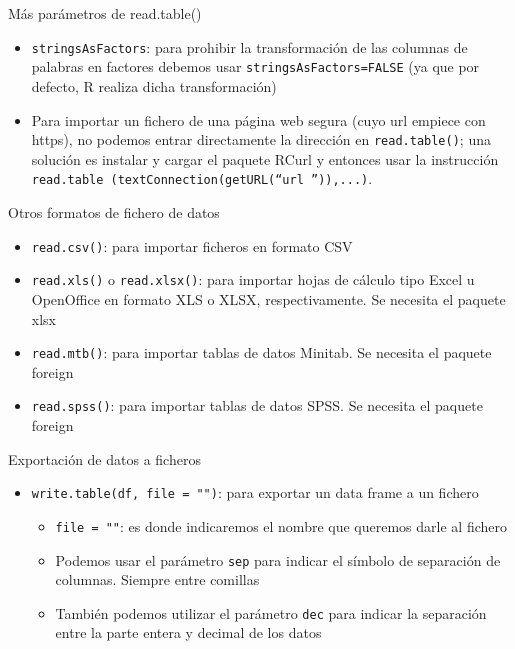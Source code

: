 \documentclass[
  ignorenonframetext,
  aspectratio=169]{beamer}
\providecommand{\tightlist}{%
  \setlength{\itemsep}{0pt}\setlength{\parskip}{0pt}}
\begin{document}
\begin{frame}[fragile]{Más parámetros de read.table()}
\protect\hypertarget{muxe1s-paruxe1metros-de-read.table}{}
\begin{itemize}
\item
  \texttt{stringsAsFactors}: para prohibir la transformación de las
  columnas de palabras en factores debemos usar
  \texttt{stringsAsFactors=FALSE} (ya que por defecto, R realiza dicha
  transformación)
\item
  Para importar un fichero de una página web segura (cuyo url empiece
  con https), no podemos entrar directamente la dirección en
  \texttt{read.table()}; una solución es instalar y cargar el paquete
  RCurl y entonces usar la instrucción
  \texttt{read.table\ (textConnection(getURL(“url\ ”)),...)}.
\end{itemize}
\end{frame}

\begin{frame}[fragile]{Otros formatos de fichero de datos}
\protect\hypertarget{otros-formatos-de-fichero-de-datos}{}
\begin{itemize}
\tightlist
\item
  \texttt{read.csv()}: para importar ficheros en formato CSV
\item
  \texttt{read.xls()} o \texttt{read.xlsx()}: para importar hojas de
  cálculo tipo Excel u OpenOffice en formato XLS o XLSX,
  respectivamente. Se necesita el paquete xlsx
\item
  \texttt{read.mtb()}: para importar tablas de datos Minitab. Se
  necesita el paquete foreign
\item
  \texttt{read.spss()}: para importar tablas de datos SPSS. Se necesita
  el paquete foreign
\end{itemize}
\end{frame}

\begin{frame}[fragile]{Exportación de datos a ficheros}
\protect\hypertarget{exportaciuxf3n-de-datos-a-ficheros}{}
\begin{itemize}
\tightlist
\item
  \texttt{write.table(df,\ file\ =\ "")}: para exportar un data frame a
  un fichero

  \begin{itemize}
  \tightlist
  \item
    \texttt{file\ =\ ""}: es donde indicaremos el nombre que queremos
    darle al fichero
  \item
    Podemos usar el parámetro \texttt{sep} para indicar el símbolo de
    separación de columnas. Siempre entre comillas
  \item
    También podemos utilizar el parámetro \texttt{dec} para indicar la
    separación entre la parte entera y decimal de los datos
  \end{itemize}
\end{itemize}
\end{frame}
\end{document}
